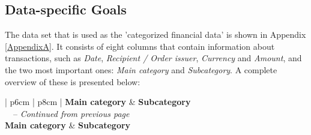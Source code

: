 
\subsection{Data-specific Goals}

The data set that is used as the 'categorized financial data' is shown in Appendix \ref{AppendixA}. It consists of eight columns that contain information about transactions, such as \textit{Date}, \textit{Recipient / Order issuer}, \textit{Currency} and \textit{Amount}, and the two most important ones: \textit{Main category} and \textit{Subcategory}. A complete overview of these is presented below:

\begin{longtable}{ | p{6cm} | p{8cm} |}
	\hline
		\textbf{Main category} & \textbf{Subcategory} \\
	\hline
	\endfirsthead %
		{\tablename\ \thetable\ -- \textit{Continued from previous page}} \\
	\hline
		\textbf{Main category} & \textbf{Subcategory} \\
	\hline
	\endhead %
	\hline
		 \\
	\endfoot %
	\hline
	\endlastfoot %
	
	
	\caption{Mapping of Main category and Subcategory of financial data set}
	\label{tbl:financialcategories}
\end{longtable}
	
